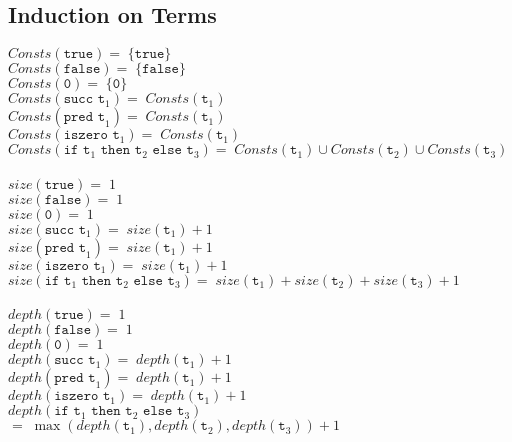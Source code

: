 \documentclass{article}
\begin{document}
\subsection{Induction on Terms}
\(Consts(\texttt{true})\)\tab\tab\tab\(=\;\{\texttt{true}\}\)\\
\(Consts(\texttt{false})\)\tab\tab\tab\(=\;\{\texttt{false}\}\)\\
\(Consts(\texttt{0})\)\tab\tab\tab\(=\;\{\texttt{0}\}\)\\
\(Consts(\texttt{succ t}_{1})\)\tab\tab\tab\(=\;Consts(\texttt{t}_{1})\)\\
\(Consts(\texttt{pred t}_{1})\)\tab\tab\tab\(=\;Consts(\texttt{t}_{1})\)\\
\(Consts(\texttt{iszero t}_{1})\)\tab\tab\tab\(=\;Consts(\texttt{t}_{1})\)\\
\(Consts(\texttt{if t}_{1}\texttt{ then t}_{2}\texttt{ else t}_{3})\)\tab\(=\;Consts(\texttt{t}_{1})\cup Consts(\texttt{t}_{2})\cup Consts(\texttt{t}_{3})\)\\\\
\(size(\texttt{true})\)\tab\tab\tab\(=\;1\)\\
\(size(\texttt{false})\)\tab\tab\tab\(=\;1\)\\
\(size(\texttt{0})\)\tab\tab\tab\tab\(=\;1\)\\
\(size(\texttt{succ t}_{1})\)\tab\tab\tab\(=\; size(\texttt{t}_{1})+1\)\\
\(size(\texttt{pred t}_{1})\)\tab\tab\tab\(=\; size(\texttt{t}_{1})+1\)\\
\(size(\texttt{iszero t}_{1})\)\tab\tab\tab\(=\; size(\texttt{t}_{1})+1\)\\
\(size(\texttt{if t}_{1}\texttt{ then t}_{2}\texttt{ else t}_{3})\)\tab\(=\; size(\texttt{t}_{1})+ size(\texttt{t}_{2})+ size(\texttt{t}_{3})+1\)\\\\
\(depth(\texttt{true})\)\tab\tab\tab\(=\;1\)\\
\(depth(\texttt{false})\)\tab\tab\tab\(=\;1\)\\
\(depth(\texttt{0})\)\tab\tab\tab\tab\(=\;1\)\\
\(depth(\texttt{succ t}_{1})\)\tab\tab\tab\(=\; depth(\texttt{t}_{1})+1\)\\
\(depth(\texttt{pred t}_{1})\)\tab\tab\tab\(=\; depth(\texttt{t}_{1})+1\)\\
\(depth(\texttt{iszero t}_{1})\)\tab\tab\tab\(=\; depth(\texttt{t}_{1})+1\)\\
\(depth(\texttt{if t}_{1}\texttt{ then t}_{2}\texttt{ else t}_{3})\)\tab\(=\; \max(depth(\texttt{t}_{1}),depth(\texttt{t}_{2}),depth(\texttt{t}_{3}))+1\)\\
\end{document}

